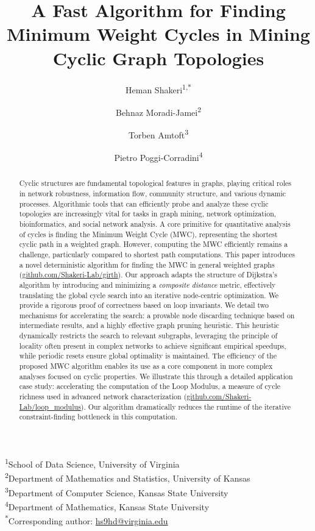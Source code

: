 \documentclass{article}
\title{A Fast Algorithm for Finding Minimum Weight Cycles in Mining Cyclic Graph Topologies}
\author{Heman Shakeri\textsuperscript{1,*} \and Behnaz Moradi-Jamei\textsuperscript{2} \and Torben Amtoft\textsuperscript{3} \and Pietro Poggi-Corradini\textsuperscript{4}}
\date{}
\begin{document}
\maketitle

\begin{abstract}
Cyclic structures are fundamental topological features in graphs, playing critical roles in network robustness, information flow, community structure, and various dynamic processes. Algorithmic tools that can efficiently probe and analyze these cyclic topologies are increasingly vital for tasks in graph mining, network optimization, bioinformatics, and social network analysis. A core primitive for quantitative analysis of cycles is finding the Minimum Weight Cycle (MWC), representing the shortest cyclic path in a weighted graph. However, computing the MWC efficiently remains a challenge, particularly compared to shortest path computations.
This paper introduces a novel deterministic algorithm for finding the MWC in general weighted graphs (\href{https://github.com/Shakeri-Lab/girth}{github.com/Shakeri-Lab/girth}). Our approach adapts the structure of Dijkstra's algorithm by introducing and minimizing a \textit{composite distance} metric, effectively translating the global cycle search into an iterative node-centric optimization. We provide a rigorous proof of correctness based on loop invariants.
We detail two mechanisms for accelerating the search: a provable node discarding technique based on intermediate results, and a highly effective graph pruning heuristic. This heuristic dynamically restricts the search to relevant subgraphs, leveraging the principle of locality often present in complex networks to achieve significant empirical speedups, while periodic resets ensure global optimality is maintained.
The efficiency of the proposed MWC algorithm enables its use as a core component in more complex analyses focused on cyclic properties. We illustrate this through a detailed application case study: accelerating the computation of the Loop Modulus, a measure of cycle richness used in advanced network characterization (\href{https://github.com/Shakeri-Lab/loop\_modulus}{github.com/Shakeri-Lab/loop\_modulus}). Our algorithm dramatically reduces the runtime of the iterative constraint-finding bottleneck in this computation.

\end{abstract}


\noindent\textsuperscript{1}School of Data Science, University of Virginia\\
\textsuperscript{2}Department of Mathematics and Statistics, University of Kansas\\
\textsuperscript{3}Department of Computer Science, Kansas State University\\
\textsuperscript{4}Department of Mathematics, Kansas State University\\
\textsuperscript{*}Corresponding author: \href{mailto:hs9hd@virginia.edu}{hs9hd@virginia.edu}
\end{document}
